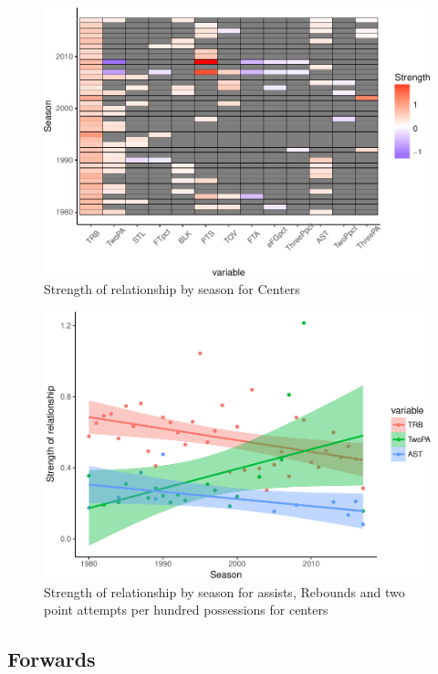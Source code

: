 \documentclass[]{elsarticle} %
\makeatletter
\def\maxwidth{\ifdim\Gin@nat@width>\linewidth\linewidth
\else\Gin@nat@width\fi}
\let\Oldincludegraphics\includegraphics
\renewcommand{\includegraphics}[1]{\Oldincludegraphics[width=\maxwidth]{#1}}
\makeatother
\begin{document}
\begin{figure}[htbp]
\centering
\includegraphics{Coaching_Selection_files/figure-latex/unnamed-chunk-7-1.pdf}
\caption{Strength of relationship by season for Centers}
\end{figure}

\begin{figure}[htbp]
\centering
\includegraphics{Coaching_Selection_files/figure-latex/unnamed-chunk-8-1.pdf}
\caption{Strength of relationship by season for assists, Rebounds and
two point attempts per hundred possessions for centers}
\end{figure}

\subsection{Forwards}\label{forwards}
\end{document}
